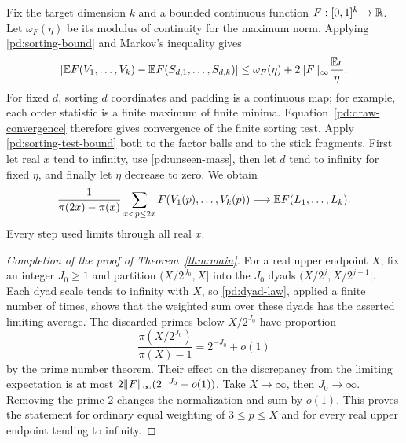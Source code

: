 Fix the target dimension $k$ and a bounded continuous function
$F:[0,1]^k\to\mathbb R$.  Let $\omega_F(\eta)$ be its modulus of
continuity for the maximum norm.  Applying \eqref{pd:sorting-bound}
and Markov's inequality gives
\begin{equation}\label{pd:sorting-test-bound}
 \left|\mathbb E F(V_1,\ldots,V_k)
       -\mathbb E F(S_{d,1},\ldots,S_{d,k})\right|
 \leq\omega_F(\eta)
       +2\lVert F\rVert_\infty\frac{\mathbb E r}{\eta}.
\end{equation}
For fixed $d$, sorting $d$ coordinates and padding is a continuous
map; for example, each order statistic is a finite maximum of
finite minima.  Equation~\eqref{pd:draw-convergence} therefore gives
convergence of the finite sorting test.  Apply
\eqref{pd:sorting-test-bound} both to the factor balls and to the
stick fragments.  First let real $x$ tend to infinity, use
\eqref{pd:unseen-mass}, then let $d$ tend to infinity for fixed
$\eta$, and finally let $\eta$ decrease to zero.  We obtain
\begin{equation}\label{pd:dyad-law}
 \frac1{\pi(2x)-\pi(x)}
 \sum_{x<p\leq2x}F(V_1(p),\ldots,V_k(p))
 \longrightarrow\mathbb E F(L_1,\ldots,L_k).
\end{equation}
Every step used limits through all real $x$.

\begin{proof}[Completion of the proof of Theorem~\ref{thm:main}]
For a real upper endpoint $X$, fix an integer $J_0\geq1$ and
partition $(X/2^{J_0},X]$ into the $J_0$ dyads
$(X/2^j,X/2^{j-1}]$.  Each dyad scale tends to infinity with $X$,
so \eqref{pd:dyad-law}, applied a finite number of times, shows
that the weighted sum over these dyads has the asserted limiting
average.  The discarded primes below $X/2^{J_0}$ have proportion
\[
 \frac{\pi(X/2^{J_0})}{\pi(X)-1}=2^{-J_0}+o(1)
\]
by the prime number theorem.  Their effect on the discrepancy from
the limiting expectation is at most
$2\lVert F\rVert_\infty(2^{-J_0}+o(1))$.
Take $X\to\infty$, then $J_0\to\infty$.  Removing the prime $2$
changes the normalization and sum by $o(1)$.  This proves the
statement for ordinary equal weighting of $3\leq p\leq X$ and
for every real upper endpoint tending to infinity.
\end{proof}
